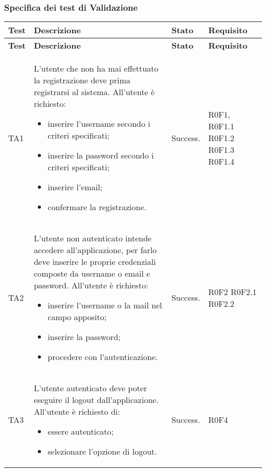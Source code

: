 \subsubsection{Specifica dei test di Validazione}
\begin{longtable}{p{2cm}!{\VRule[1pt]}p{7cm}!{\VRule[1pt]}p{1.5cm}!{\VRule[1pt]}p{2.5cm}}
\color{white} \textbf{Test} & \color{white} \textbf{Descrizione}  & \color{white} \textbf{Stato}  & \color{white} \textbf{Requisito}\\ 
\endfirsthead 
{} 
\color{white} \textbf{Test} & \color{white} \textbf{Descrizione}  & \color{white} \textbf{Stato}  & \color{white} \textbf{Requisito}\\  
\endhead 
TA1 & L'utente che non ha mai effettuato la registrazione deve prima registrarsi al sistema. All'utente è richiesto: \begin{itemize}
\item inserire l'username secondo i criteri specificati;
\item inserire la password secondo i criteri specificati;
\item inserire l'email;
\item confermare la registrazione.
\end{itemize} & Success. & R0F1, R0F1.1 \newline R0F1.2 R0F1.3 \newline R0F1.4\\

TA2 & L'utente non autenticato intende accedere all'applicazione, per farlo deve inserire le proprie credenziali composte da username o email e password. All'utente è richiesto: \begin{itemize}
\item inserire l'username o la mail nel campo apposito;
\item inserire la password;
\item procedere con l'autenticazione.
\end{itemize} & Success. & R0F2 R0F2.1 \newline R0F2.2\\

TA3 & L'utente autenticato deve poter eseguire il logout dall'applicazione. All'utente è richiesto di:\begin{itemize}
\item essere autenticato;
\item selezionare l'opzione di logout.
\end{itemize} & Success. & R0F4\\


\end{longtable}
